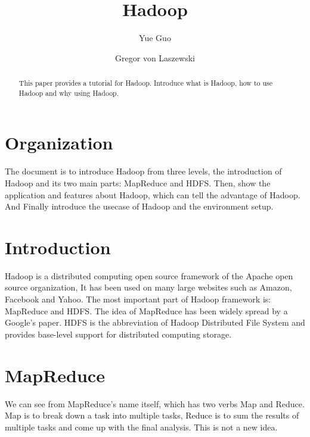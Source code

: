 
\title{Hadoop}



\author{Yue Guo}


\author{Gregor von Laszewski}



\begin{abstract}
This paper provides a tutorial for Hadoop. Introduce what is Hadoop, how to use Hadoop and why using Hadoop.
\end{abstract}



\maketitle

\section{Organization}
The document is to introduce Hadoop from three levels, the introduction of Hadoop and its  two main parts: MapReduce and HDFS. Then, show the application and features about Hadoop, which can tell the advantage of Hadoop. And Finally introduce the usecase of Hadoop and the environment setup.

\section{Introduction}
Hadoop is a distributed computing open source framework of the Apache open source organization, It has been used on many large websites such as Amazon, Facebook and Yahoo. The most important part of Hadoop framework is: MapReduce and HDFS. The idea of MapReduce has been widely spread by a Google's paper. HDFS is the abbreviation of Hadoop Distributed File System and provides base-level support for distributed computing storage.


\section{MapReduce}
We can see from MapReduce's name itself, which has two verbs Map and Reduce. Map is to break down a task into multiple tasks, Reduce is to sum the results of multiple tasks and come up with the final analysis. This is not a new idea. 

